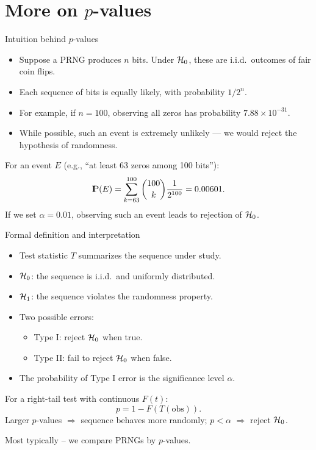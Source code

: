 \documentclass[aspectratio=169]{beamer}
\newcommand{\Prob}{{\rm I\hspace{-0.8mm}P}}
\begin{document}
\section{More on $p$-values}
\begin{frame}{Intuition behind $p$-values}
\begin{itemize}
 \item Suppose a PRNG produces $n$ bits. Under ${\cal H}_0$, these are i.i.d.\ outcomes of fair coin flips.
 \item Each sequence of bits is equally likely, with probability $1/2^n$.
 \item For example, if $n=100$, observing all zeros has probability $7.88 \times 10^{-31}$.
 \item While possible, such an event is extremely unlikely --- we would reject the hypothesis of randomness.
\end{itemize}

\medskip
\noindent
For an event $E$ (e.g., ``at least 63 zeros among 100 bits''):
\[
\Prob(E)=\sum_{k=63}^{100}{100\choose k}\frac{1}{2^{100}}=0.00601.
\]
If we set $\alpha=0.01$, observing such an event leads to rejection of ${\cal H}_0$.
\end{frame}

\begin{frame}{Formal definition and interpretation}
\begin{itemize}
 \item Test statistic $T$ summarizes the sequence under study.
 \item ${\cal H}_0$: the sequence is i.i.d.\ and uniformly distributed.
 \item ${\cal H}_1$: the sequence violates the randomness property.
 \item Two possible errors:
   \begin{itemize}
     \item Type I: reject ${\cal H}_0$ when true.
     \item Type II: fail to reject ${\cal H}_0$ when false.
   \end{itemize}
 \item The probability of Type I error is the significance level $\alpha$.
\end{itemize}

\medskip
For a right-tail test with continuous $F(t)$:
\[
p = 1 - F(T(\text{obs})).
\]
Larger $p$-values $\Rightarrow$ sequence behaves more randomly;
$p < \alpha$ $\Rightarrow$ reject ${\cal H}_0$. \par
Most typically -- we compare PRNGs by $p$-values.
\end{frame}
\end{document}
